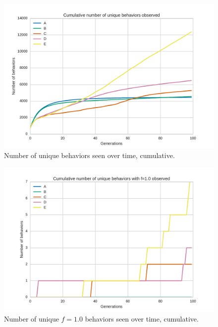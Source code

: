 \begin{figure}
\centering
\includegraphics[width=\columnwidth]{fig/cummulative_unique_behaviors}
\caption{
    Number of unique behaviors seen over time, cumulative.
}
\label{fig:cummulative_unique_behaviors}
\end{figure}

\begin{figure}
\centering
\includegraphics[width=\columnwidth]{fig/cummulative_unique_perfect}
\caption{
    Number of unique $f=1.0$ behaviors seen over time, cumulative.
}
\label{fig:cummulative_unique_perfect}
\end{figure}


